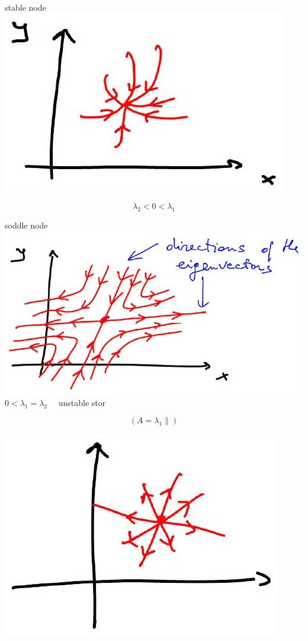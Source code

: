 \documentclass[10pt]{article}
\begin{document}
stable node\\
\includegraphics[max width=\textwidth, center]{2025_10_19_55a7d61d84e6ce9a1c8cg-4}

$$
\lambda_{2}<0<\lambda_{1}
$$

soddle node\\
\includegraphics[max width=\textwidth, center]{2025_10_19_55a7d61d84e6ce9a1c8cg-4(3)}\\
$0<\lambda_{1}=\lambda_{2} \quad$ unstable stor

$$
\left(A=\lambda_{1} \|\right)
$$

\begin{center}
\includegraphics[max width=\textwidth]{2025_10_19_55a7d61d84e6ce9a1c8cg-4(1)}
\end{center}
\end{document}
